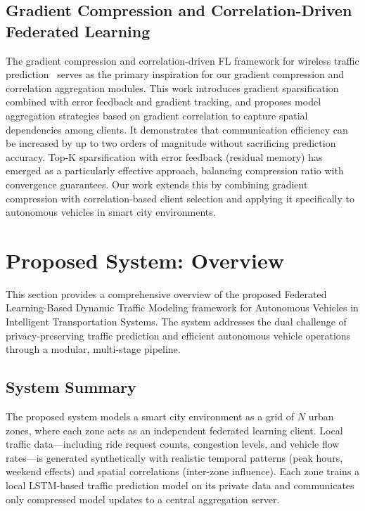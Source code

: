 \documentclass[journal]{IEEEtran}
\begin{document}
\subsection{Gradient Compression and Correlation-Driven Federated Learning}
The gradient compression and correlation-driven FL framework for wireless traffic prediction~\cite{ref4} serves as the primary inspiration for our gradient compression and correlation aggregation modules. This work introduces gradient sparsification combined with error feedback and gradient tracking, and proposes model aggregation strategies based on gradient correlation to capture spatial dependencies among clients. It demonstrates that communication efficiency can be increased by up to two orders of magnitude without sacrificing prediction accuracy. Top-K sparsification with error feedback (residual memory) has emerged as a particularly effective approach, balancing compression ratio with convergence guarantees. Our work extends this by combining gradient compression with correlation-based client selection and applying it specifically to autonomous vehicles in smart city environments.


\section{Proposed System: Overview}

This section provides a comprehensive overview of the proposed Federated Learning-Based Dynamic Traffic Modeling framework for Autonomous Vehicles in Intelligent Transportation Systems. The system addresses the dual challenge of privacy-preserving traffic prediction and efficient autonomous vehicle operations through a modular, multi-stage pipeline.

\subsection{System Summary}

The proposed system models a smart city environment as a grid of $N$ urban zones, where each zone acts as an independent federated learning client. Local traffic data---including ride request counts, congestion levels, and vehicle flow rates---is generated synthetically with realistic temporal patterns (peak hours, weekend effects) and spatial correlations (inter-zone influence). Each zone trains a local LSTM-based traffic prediction model on its private data and communicates only compressed model updates to a central aggregation server.
\end{document}
